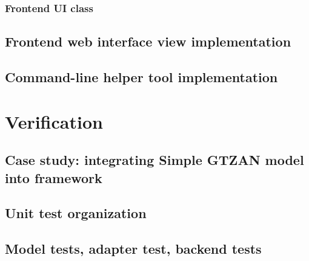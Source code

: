 \documentclass[
    bindingoffset=5mm,  %
    footnoteindent=3mm, %
    hyphenation=true    %
]{src/wut-thesis}
\begin{document}
\subsubsection{Frontend UI class}

\subsection{Frontend web interface view implementation}

\subsection{Command-line helper tool implementation}

%
%
\clearpage %
\section{Verification} \label{ch:verification}

\subsection{Case study: integrating Simple GTZAN model into framework}
\subsection{Unit test organization}
\subsection{Model tests, adapter test, backend tests}
\end{document}
